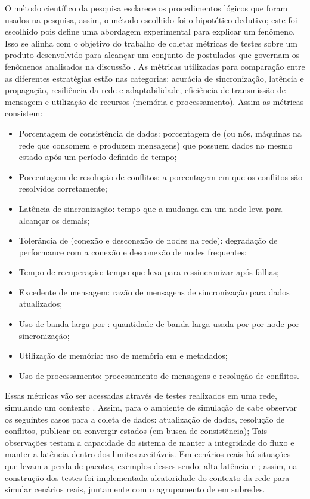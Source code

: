O método científico da pesquisa esclarece os procedimentos lógicos que foram usados na pesquisa, assim, o método escolhido foi o hipotético-dedutivo; este foi escolhido pois define uma abordagem experimental para explicar um fenômeno. Isso se alinha com o objetivo do trabalho de coletar métricas de testes sobre um produto desenvolvido para alcançar um conjunto de postulados que governam os fenômenos analisados na discussão \cite{gil2008metodos}. As métricas utilizadas para comparação entre as diferentes estratégias estão nas categorias: acurácia de sincronização, latência e propagação, resiliência da rede e adaptabilidade, eficiência de transmissão de mensagem e utilização de recursos (memória e processamento). Assim as métricas consistem:

\begin{itemize}[leftmargin=1.5cm]
  \item Porcentagem de consistência de dados: porcentagem de  (ou nós, máquinas na rede que consomem e produzem mensagens) que possuem dados no mesmo estado após um período definido de tempo;
  \item Porcentagem de resolução de conflitos: a porcentagem em que os conflitos são resolvidos corretamente; 
  \item Latência de sincronização: tempo que a mudança em um node leva para alcançar os demais;
  \item Tolerância de  (conexão e desconexão de nodes na rede): degradação de performance com a conexão e desconexão de nodes frequentes;
  \item Tempo de recuperação: tempo que leva para ressincronizar após falhas;
  \item Excedente de mensagem: razão de mensagens de sincronização para dados atualizados;
  \item Uso de banda larga por : quantidade de banda larga usada por por node por sincronização;
  \item Utilização de memória: uso de memória em  e metadados;
  \item Uso de processamento: processamento de mensagens e resolução de conflitos.
\end{itemize}

Essas métricas vão ser acessadas através de testes realizados em uma rede, simulando um contexto . Assim, para o ambiente de simulação de  cabe observar os seguintes casos para a coleta de dados: atualização de dados, resolução de conflitos, publicar ou convergir estados (em busca de consistência); Tais observações testam a capacidade do sistema de manter a integridade do fluxo e manter a latência dentro dos limites aceitáveis. Em cenários reais há situações que levam a perda de pacotes, exemplos desses sendo: alta latência e  \cite{Nasrallah2018ULL}; assim, na construção dos testes foi implementada aleatoridade do contexto da rede para simular cenários reais, juntamente com o agrupamento de  em subredes.

